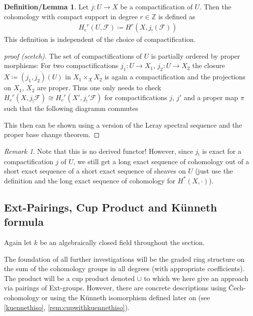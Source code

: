 \documentclass[english]{scrartcl}
\theoremstyle{definition}
\newtheorem{DefLem}[Def]{Definition/Lemma}
\theoremstyle{remark}
\newtheorem{Rem}[Def]{Remark}
\newcommand*{\Z}{\mathds{Z}}
\newcommand*{\F}{\mathcal{F}} %
\newcommand*{\Hc}{{H_c}} %
\begin{document}
\begin{DefLem}\label{def:cptcohomology}
  Let $j\colon U\to X$ be a compactification of $U$. Then the
  cohomology with compact support in degree $r\in\Z$ is defined as
  \begin{gather*}
    \Hc^r(U,\F) \coloneqq H^r(X,j_!(\F))
  \end{gather*}
  This definition is independent of the choice of compactification.
  \begin{proof}[proof (scetch)]
    The set of compactifications of $U$ is partially ordered by proper
    morphisms:
    For two compactifications $j_1\colon U\to X_1$,
    $j_2\colon U\to X_2$ the closure
    $X\coloneqq\overline{(j_1,j_2)(U)}$ in $X_1\times_X X_2$ is again
    a compactification and the projections on $X_1$, $X_2$ are proper.
    Thus one only needs to check $\Hc^r(X,j_!\F)\cong\Hc^r(X',j_!'\F)$
    for compactifications $j$, $j'$ and a proper map $\pi$ such that
    the following diagramm commutes
    \begin{center}
    \end{center}
    This then can be shown using a version of the Leray spectral
    sequence and the proper base change theorem.
  \end{proof}
\end{DefLem}

\begin{Rem}
  Note that this is no derived functor!
  However, since $j_!$ is exact for a compactification $j$ of $U$, we
  still get a long exact sequence of cohomology out of a short exact
  sequence of a short exact sequence of sheaves on $U$
  (just use the definition and the long exact sequence of cohomology for
  $H^*(X,\cdot)$).
\end{Rem}

\subsection{Ext-Pairings, Cup Product and Künneth formula}
Again let $k$ be an algebraically closed field throughout the
section.

The foundation of all further investigations will be the graded
ring structure on the sum of the cohomology groups in all degrees
(with appropriate coefficients). The product will be a cup product
denoted $\cup$ to which we here give an approach via pairings of
Ext-groups. 
However, there are concrete descriptions using Čech-cohomology
\cite[see][Chap.~10 and Chap.~22, Cup-products]{milne}
or using the Künneth isomorphism defined later on (see
\autoref{kuennethiso}, \autoref{rem:cupwithkuennethiso}).
\end{document}
